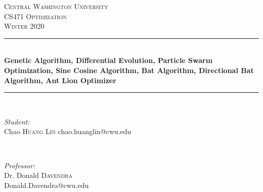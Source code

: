 \documentclass[12pt]{article}
\begin{document}
    
    \begin{titlepage}
        
        \newcommand{\HRule}{\rule{\linewidth}{0.5mm}} %
        
        \center %
        
        
        \textsc{\LARGE Central Washington University}\\[1.5cm] %
        \textsc{\Large CS471 Optimization}\\[0.5cm] %
        \textsc{\large Winter 2020}\\[0.5cm] %
        
        
        \HRule \\[0.4cm]
        { \huge \bfseries Genetic Algorithm, Differential Evolution, Particle Swarm Optimization, Sine Cosine Algorithm, Bat Algorithm, Directional Bat Algorithm, Ant Lion Optimizer}\\[0.2cm] %
        \HRule \\[1cm]
        
        
        \begin{minipage}{0.5\textwidth}
            \begin{flushleft} \large
                \emph{Student:}\\
                Chao \textsc{Huang Lin} chao.huanglin@cwu.edu
                
                
            \end{flushleft}
        \end{minipage}
        ~
        \begin{minipage}{0.45\textwidth}
            \begin{flushright} \large
                \emph{Professor:} \\
                Dr. Donald \textsc{Davendra}\\ %
                Donald.Davendra@cwu.edu
            \end{flushright}
        \end{minipage}\\[0.5cm]
        

\end{titlepage}
\end{document}
